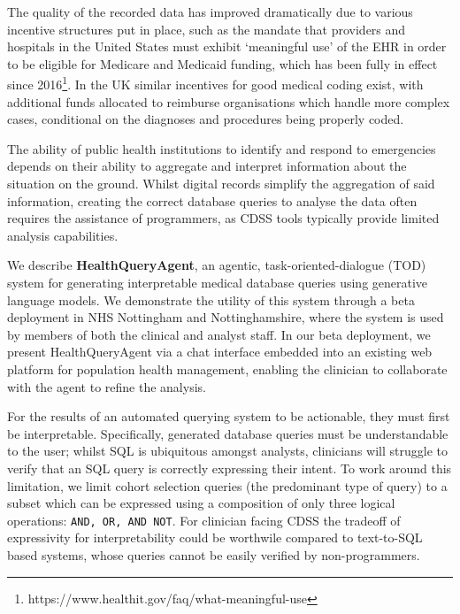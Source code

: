 \documentclass[11pt]{article}
\begin{document}
The quality of the recorded data has improved dramatically due to various incentive structures put in place, such as the mandate that providers and hospitals in the United States must exhibit `meaningful use' of the EHR in order to be eligible for Medicare and Medicaid funding, which has been fully in effect since 2016\footnote{https://www.healthit.gov/faq/what-meaningful-use}. In the UK similar incentives for good medical coding exist, with additional funds allocated to reimburse organisations which handle more complex cases, conditional on the diagnoses and procedures being properly coded.


The ability of public health institutions to identify and respond to emergencies depends on their ability to aggregate and interpret information about the situation on the ground. Whilst digital records simplify the aggregation of said information, creating the correct database queries to analyse the data often requires the assistance of programmers, as CDSS tools typically provide limited analysis capabilities.



We describe \textbf{HealthQueryAgent}, an agentic, task-oriented-dialogue (TOD) system for generating interpretable medical database queries using generative language models. We demonstrate the utility of this system through a beta deployment in NHS Nottingham and Nottinghamshire, where the system is used by members of both the clinical and analyst staff.
In our beta deployment, we present HealthQueryAgent via a chat interface embedded into an existing web platform for population health management, enabling the clinician to collaborate with the agent to refine the analysis. %

For the results of an automated querying system to be actionable, they must first be interpretable. Specifically, generated database queries must be understandable to the user; whilst SQL is ubiquitous amongst analysts, clinicians will struggle to verify that an SQL query is correctly expressing their intent. To work around this limitation, we limit cohort selection queries (the predominant type of query) to a subset which can be expressed using a composition of only three logical operations: \texttt{AND, OR, AND NOT}. For clinician facing CDSS the tradeoff of expressivity for interpretability could be worthwile compared to text-to-SQL based systems, whose queries cannot be easily verified by non-programmers.
\end{document}
